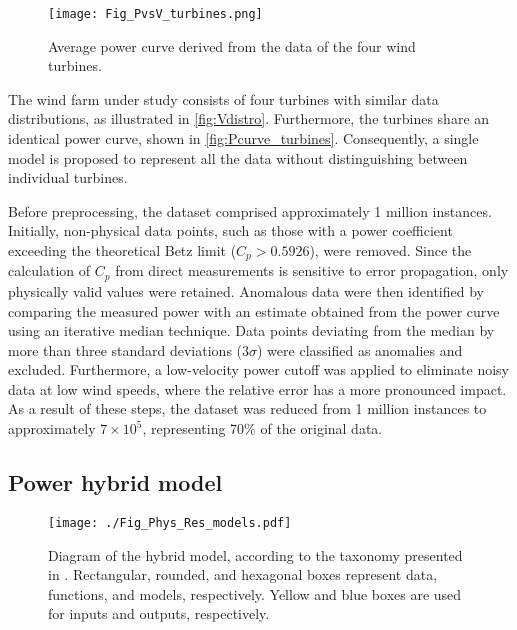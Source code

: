 \documentclass[preprint,12pt]{elsarticle}
\begin{document}
\begin{figure}[h!]
    \centering
    \texttt{[image: Fig\_PvsV\_turbines.png]}
    \caption{Average power curve derived from the data of the four wind turbines.}
    \label{fig:Pcurve_turbines}
\end{figure}

The wind farm under study consists of four turbines with similar data distributions, as illustrated in \autoref{fig:Vdistro}. Furthermore, the turbines share an identical power curve, shown in \autoref{fig:Pcurve_turbines}. Consequently, a single model is proposed to represent all the data without distinguishing between individual turbines.

Before preprocessing, the dataset comprised approximately 1 million instances. Initially, non-physical data points, such as those with a power coefficient exceeding the theoretical Betz limit ($C_p>0.5926$), were removed. Since the calculation of $C_p$ from direct measurements is sensitive to error propagation, only physically valid values were retained. Anomalous data were then identified by comparing the measured power with an estimate obtained from the power curve using an iterative median technique. Data points deviating from the median by more than three standard deviations (3$\sigma$) were classified as anomalies and excluded. Furthermore, a low-velocity power cutoff was applied to eliminate noisy data at low wind speeds, where the relative error has a more pronounced impact. As a result of these steps, the dataset was reduced from 1 million instances to approximately $7\times10^5$, representing 70\% of the original data.

\subsection{Power hybrid model}\label{subsec:hybrid_moel}

\begin{figure}[t]
    \centering
    \texttt{[image: ./Fig\_Phys\_Res\_models.pdf]}
    \caption{Diagram of the hybrid model, according to the taxonomy presented in \cite{vanBekkum2021}. Rectangular, rounded, and hexagonal boxes represent data, functions, and models, respectively. Yellow and blue boxes are used for inputs and outputs, respectively.}
    \label{fig:model_diagram}
\end{figure} 
\end{document}
